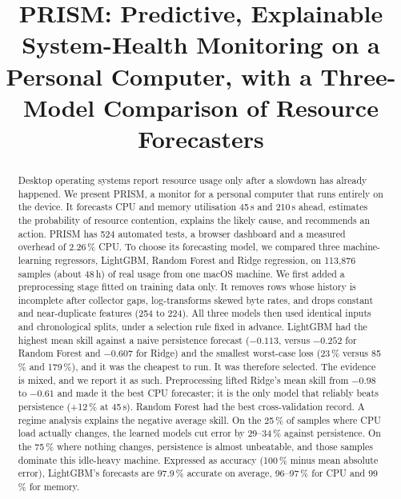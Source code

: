 \documentclass[conference]{IEEEtran}
\begin{document}
\title{PRISM: Predictive, Explainable System-Health Monitoring on a Personal Computer, with a Three-Model Comparison of Resource Forecasters}

\author{
\and
{}
\and
{}
}

\maketitle

\begin{abstract}
Desktop operating systems report resource usage only after a slowdown has
already happened. We present PRISM, a monitor for a personal computer that runs
entirely on the device. It forecasts CPU and memory utilisation 45\,s and
210\,s ahead, estimates the probability of resource contention, explains the
likely cause, and recommends an action. PRISM has 524 automated tests, a browser dashboard and a measured overhead
of 2.26\,\% CPU. To choose its
forecasting model, we compared three machine-learning regressors, LightGBM,
Random Forest and Ridge regression, on 113{,}876 samples (about 48\,h) of real
usage from one macOS machine. We first added a preprocessing stage fitted on
training data only. It removes rows whose history is incomplete after
collector gaps, log-transforms skewed byte rates, and drops constant and
near-duplicate features (254 to 224). All three models then used identical
inputs and chronological splits, under a selection rule fixed in advance.
LightGBM had the highest mean skill against a naive persistence forecast
($-0.113$, versus $-0.252$ for Random Forest and $-0.607$ for Ridge) and the
smallest worst-case loss (23\,\% versus 85\,\% and 179\,\%), and it was the
cheapest to run. It was therefore selected. The evidence is mixed, and we
report it as such. Preprocessing lifted Ridge's mean skill from $-0.98$ to
$-0.61$ and made it the best CPU forecaster; it is the only model that reliably
beats persistence (+12\,\% at 45\,s). Random Forest had the best
cross-validation record. A regime analysis explains the negative average
skill. On the 25\,\% of samples where CPU load actually changes, the learned
models cut error by 29--34\,\% against persistence. On the 75\,\% where
nothing changes, persistence is almost unbeatable, and those samples dominate
this idle-heavy machine. Expressed as accuracy (100\,\% minus mean absolute
error), LightGBM's forecasts are 97.9\,\% accurate on average, 96--97\,\% for
CPU and 99\,\% for memory.
\end{abstract}
\end{document}
